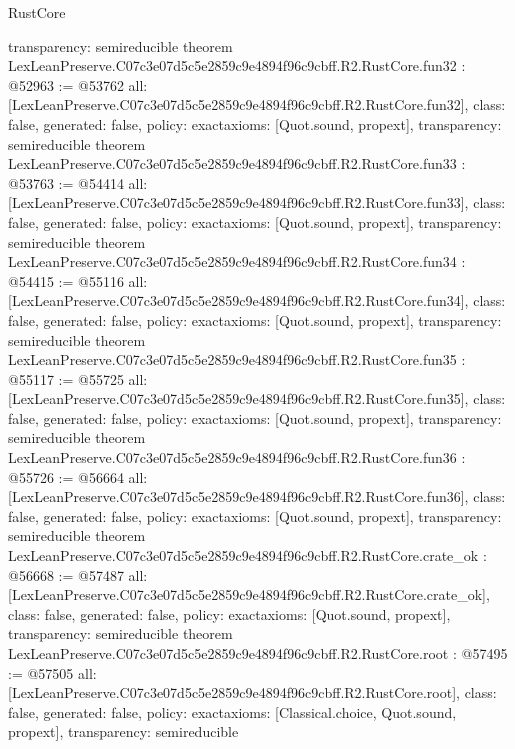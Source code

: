 \begin{lexlean}{RustCore}
\begin{coremodule}
{  transparency: semireducible
}
theorem LexLeanPreserve.C07c3e07d5c5e2859c9e4894f96c9cbff.R2.RustCore.fun32 : @52963 := @53762 {
  all: [LexLeanPreserve.C07c3e07d5c5e2859c9e4894f96c9cbff.R2.RustCore.fun32],
  class: false,
  generated: false,
  policy: exact{axioms: [Quot.sound, propext]},
  transparency: semireducible
}
theorem LexLeanPreserve.C07c3e07d5c5e2859c9e4894f96c9cbff.R2.RustCore.fun33 : @53763 := @54414 {
  all: [LexLeanPreserve.C07c3e07d5c5e2859c9e4894f96c9cbff.R2.RustCore.fun33],
  class: false,
  generated: false,
  policy: exact{axioms: [Quot.sound, propext]},
  transparency: semireducible
}
theorem LexLeanPreserve.C07c3e07d5c5e2859c9e4894f96c9cbff.R2.RustCore.fun34 : @54415 := @55116 {
  all: [LexLeanPreserve.C07c3e07d5c5e2859c9e4894f96c9cbff.R2.RustCore.fun34],
  class: false,
  generated: false,
  policy: exact{axioms: [Quot.sound, propext]},
  transparency: semireducible
}
theorem LexLeanPreserve.C07c3e07d5c5e2859c9e4894f96c9cbff.R2.RustCore.fun35 : @55117 := @55725 {
  all: [LexLeanPreserve.C07c3e07d5c5e2859c9e4894f96c9cbff.R2.RustCore.fun35],
  class: false,
  generated: false,
  policy: exact{axioms: [Quot.sound, propext]},
  transparency: semireducible
}
theorem LexLeanPreserve.C07c3e07d5c5e2859c9e4894f96c9cbff.R2.RustCore.fun36 : @55726 := @56664 {
  all: [LexLeanPreserve.C07c3e07d5c5e2859c9e4894f96c9cbff.R2.RustCore.fun36],
  class: false,
  generated: false,
  policy: exact{axioms: [Quot.sound, propext]},
  transparency: semireducible
}
theorem LexLeanPreserve.C07c3e07d5c5e2859c9e4894f96c9cbff.R2.RustCore.crate_ok : @56668 := @57487 {
  all: [LexLeanPreserve.C07c3e07d5c5e2859c9e4894f96c9cbff.R2.RustCore.crate_ok],
  class: false,
  generated: false,
  policy: exact{axioms: [Quot.sound, propext]},
  transparency: semireducible
}
theorem LexLeanPreserve.C07c3e07d5c5e2859c9e4894f96c9cbff.R2.RustCore.root : @57495 := @57505 {
  all: [LexLeanPreserve.C07c3e07d5c5e2859c9e4894f96c9cbff.R2.RustCore.root],
  class: false,
  generated: false,
  policy: exact{axioms: [Classical.choice, Quot.sound, propext]},
  transparency: semireducible
}


\end{coremodule}
\end{lexlean}
